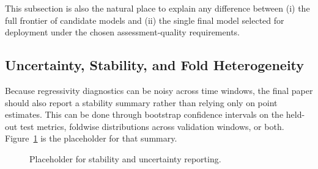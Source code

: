 \documentclass[12pt, draft]{article}
\theoremstyle{plain}
\theoremstyle{definition}
\newcommand{\1}{\mathbf{1}}
\begin{document}
\begin{table}[t]
\centering
\caption{Placeholder for the exact empirical calibration rule used on validation folds.}
\label{tab:calibration_constraints_placeholder}
\end{table}

\begin{table}[t]
\centering
\caption{Placeholder for the final selected configuration under constrained calibration.}
\label{tab:selected_model_placeholder}
\end{table}

This subsection is also the natural place to explain any difference between (i) the full frontier of candidate models and (ii) the single final model selected for deployment under the chosen assessment-quality requirements.

\subsection{Uncertainty, Stability, and Fold Heterogeneity}

Because regressivity diagnostics can be noisy across time windows, the final paper should also report a stability summary rather than relying only on point estimates. This can be done through bootstrap confidence intervals on the held-out test metrics, foldwise distributions across validation windows, or both. Figure~\ref{fig:stability_placeholder} is the placeholder for that summary.

\begin{figure}[t]
\centering
{}
\caption{Placeholder for stability and uncertainty reporting.}
\label{fig:stability_placeholder}
\end{figure}
\end{document}
